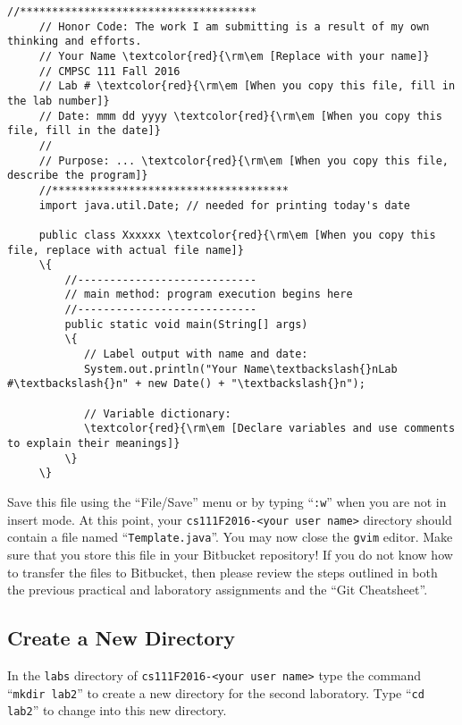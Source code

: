 \newpage
\begin{Verbatim}[commandchars=\\\{\}]
     //*************************************
     // Honor Code: The work I am submitting is a result of my own thinking and efforts.
     // Your Name \textcolor{red}{\rm\em [Replace with your name]}
     // CMPSC 111 Fall 2016
     // Lab # \textcolor{red}{\rm\em [When you copy this file, fill in the lab number]}
     // Date: mmm dd yyyy \textcolor{red}{\rm\em [When you copy this file, fill in the date]}
     //
     // Purpose: ... \textcolor{red}{\rm\em [When you copy this file, describe the program]}
     //*************************************
     import java.util.Date; // needed for printing today's date

     public class Xxxxxx \textcolor{red}{\rm\em [When you copy this file, replace with actual file name]}
     \{
         //----------------------------
         // main method: program execution begins here
         //----------------------------
         public static void main(String[] args)
         \{
            // Label output with name and date:
            System.out.println("Your Name\textbackslash{}nLab #\textbackslash{}n" + new Date() + "\textbackslash{}n");

            // Variable dictionary:
            \textcolor{red}{\rm\em [Declare variables and use comments to explain their meanings]}
         \}
     \}
\end{Verbatim}

\vspace*{-.1in}

\noindent Save this file using the ``File/Save'' menu or by typing ``{\tt :w}'' when you are not in insert mode. At this
point, your {\tt cs111F2016-<your user name>} directory should contain a file named ``{\tt Template.java}''. You may now
close the {\tt gvim} editor. Make sure that you store this file in your Bitbucket repository! If you do not know how to
transfer the files to Bitbucket, then please review the steps outlined in both the previous practical and laboratory
assignments and the ``Git Cheatsheet''.

\vspace*{-.1in}
\subsection*{Create a New Directory}

In the {\tt labs} directory of {\tt cs111F2016-<your user name>} type the command ``{\tt mkdir lab2}'' to create a new
directory for the second laboratory.  \noindent Type ``{\tt cd lab2}'' to change into this new directory.

